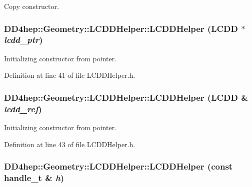 Copy constructor. \hypertarget{class_d_d4hep_1_1_geometry_1_1_l_c_d_d_helper_a7b67df64bd69db0925571a28a4bd71b5}{
\subsubsection[{LCDDHelper}]{\setlength{\rightskip}{0pt plus 5cm}DD4hep::Geometry::LCDDHelper::LCDDHelper ({\bf LCDD} $\ast$ {\em lcdd\_\-ptr})}}
\label{class_d_d4hep_1_1_geometry_1_1_l_c_d_d_helper_a7b67df64bd69db0925571a28a4bd71b5}


Initializing constructor from pointer. 

Definition at line 41 of file LCDDHelper.h.\hypertarget{class_d_d4hep_1_1_geometry_1_1_l_c_d_d_helper_a086987c0a25ab742409a82a6f1bce2ed}{
\subsubsection[{LCDDHelper}]{\setlength{\rightskip}{0pt plus 5cm}DD4hep::Geometry::LCDDHelper::LCDDHelper ({\bf LCDD} \& {\em lcdd\_\-ref})}}
\label{class_d_d4hep_1_1_geometry_1_1_l_c_d_d_helper_a086987c0a25ab742409a82a6f1bce2ed}


Initializing constructor from pointer. 

Definition at line 43 of file LCDDHelper.h.\hypertarget{class_d_d4hep_1_1_geometry_1_1_l_c_d_d_helper_ae1ee4bd05ac79164b7fc6951b1830da6}{
\subsubsection[{LCDDHelper}]{\setlength{\rightskip}{0pt plus 5cm}DD4hep::Geometry::LCDDHelper::LCDDHelper (const {\bf handle\_\-t} \& {\em h})}}
\label{class_d_d4hep_1_1_geometry_1_1_l_c_d_d_helper_ae1ee4bd05ac79164b7fc6951b1830da6}


